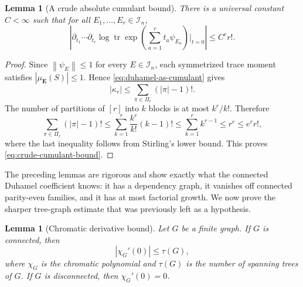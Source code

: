 \documentclass[11pt]{article}
\newtheorem{lemma}[theorem]{Lemma}
\newcommand{\tr}{\operatorname{tr}}
\newcommand{\calI}{\mathcal{I}}
\newcommand{\norm}[1]{\left\lVert #1\right\rVert}
\begin{document}
\begin{lemma}[A crude absolute cumulant bound]
  \label{lem:crude-cumulant-bound}
  There is a universal constant $C<\infty$ such that for all
  $E_1,\ldots,E_r\in\calI_n$,
  \begin{equation}\label{eq:crude-cumulant-bound}
    \left|
      \partial_{t_1}\cdots\partial_{t_r}
      \log\tr\exp\left(\sum_{a=1}^r t_a\psi_{E_a}\right)\bigg|_{t=0}
    \right|
    \leq
    C^r r!.
  \end{equation}
\end{lemma}

\begin{proof}
  Since $\norm{\psi_E}\leq1$ for every $E\in\calI_n$, each symmetrized trace
  moment satisfies $|\mu_{\mathbf E}(S)|\leq1$.  Hence
  \eqref{eq:duhamel-as-cumulant} gives
  \begin{equation}\label{eq:cumulant-partition-sum-bound}
    |\kappa_r|
    \leq
    \sum_{\pi\in\Pi_r}(|\pi|-1)!.
  \end{equation}
  The number of partitions of $[r]$ into $k$ blocks is at most $k^r/k!$.
  Therefore
  \begin{equation}\label{eq:cumulant-partition-sum-bound-2}
    \sum_{\pi\in\Pi_r}(|\pi|-1)!
    \leq
    \sum_{k=1}^r \frac{k^r}{k!}(k-1)!
    \leq
    \sum_{k=1}^r k^{r-1}
    \leq
    r^r
    \leq
    e^r r!,
  \end{equation}
  where the last inequality follows from Stirling's lower bound.  This proves
  \eqref{eq:crude-cumulant-bound}.
\end{proof}

The preceding lemmas are rigorous and show exactly what the connected Duhamel
coefficient knows: it has a dependency graph, it vanishes off connected
parity-even families, and it has at most factorial growth.  We now prove the
sharper tree-graph estimate that was previously left as a hypothesis.

\begin{lemma}[Chromatic derivative bound]
  \label{lem:chromatic-derivative-bound}
  Let $G$ be a finite graph.  If $G$ is connected, then
  \begin{equation}\label{eq:chromatic-derivative-bound}
    |\chi_G'(0)|
    \leq
    \tau(G),
  \end{equation}
  where $\chi_G$ is the chromatic polynomial and $\tau(G)$ is the number of
  spanning trees of $G$.  If $G$ is disconnected, then $\chi_G'(0)=0$.
\end{lemma}
\end{document}

